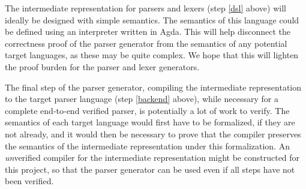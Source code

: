 \documentclass{article}
\begin{document}
	The intermediate representation for parsers and lexers (step \ref{dsl}
	above) will ideally be designed with simple semantics. The semantics of
	this language could be defined using an interpreter written in Agda. This
	will help disconnect the correctness proof of the parser generator from the
	semantics of any potential target languages, as these may be quite complex.
	We hope that this will lighten the proof burden for the parser and lexer
	generators.


	The final step of the parser generator, compiling the intermediate
	representation to the target parser language (step \ref{backend} above),
	while necessary for a complete end-to-end verified parser, is potentially a
	lot of work to verify. The semantics of each target language would first
	have to be formalized, if they are not already, and it would then be
	necessary to prove that the compiler preserves the semantics of the
	intermediate representation under this formalization. An \emph{un}verified
	compiler for the intermediate representation might be constructed for this
	project, so that the parser generator can be used even if all steps have
	not been verified.




\newpage




\end{document}
